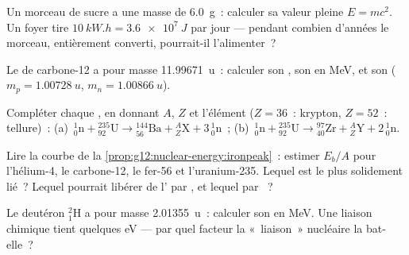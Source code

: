 \begin{exercise}[$\star$]\label{exo:g12:nuclear-energy:2}
Un morceau de sucre a une masse de \qty{6.0}{g}~: calculer sa valeur
pleine $E = mc^2$. Un foyer tire $\qty{10}{kW.h} = \qty{3.6e7}{J}$ par
jour --- pendant combien d'années le morceau, entièrement converti,
pourrait-il l'alimenter~?
\end{exercise}

\begin{exercise}[$\star$]\label{exo:g12:nuclear-energy:3}
Le  de carbone-12 a pour masse
\qty{11.99671}{u}~: calculer son , son
 en \unit{MeV}, et son
($m_p = \qty{1.00728}{u}$, $m_n = \qty{1.00866}{u}$).
\end{exercise}

\begin{exercise}[$\star$]\label{exo:g12:nuclear-energy:4}
Compléter chaque , en donnant $A$, $Z$ et
l'élément ($Z = 36$~: krypton, $Z = 52$~: tellure)~:
(a)~${}^{1}_{0}\mathrm{n} + {}^{235}_{92}\mathrm{U} \to
{}^{144}_{56}\mathrm{Ba} + {}^{A}_{Z}\mathrm{X} + 3\,{}^{1}_{0}\mathrm{n}$~;
(b)~${}^{1}_{0}\mathrm{n} + {}^{235}_{92}\mathrm{U} \to
{}^{97}_{40}\mathrm{Zr} + {}^{A}_{Z}\mathrm{Y} + 2\,{}^{1}_{0}\mathrm{n}$.
\end{exercise}

\begin{exercise}[$\star$]\label{exo:g12:nuclear-energy:5}
Lire la courbe de la \cref{prop:g12:nuclear-energy:ironpeak}~: estimer
$E_b/A$ pour l'hélium-4, le carbone-12, le fer-56 et l'uranium-235.
Lequel est le plus solidement lié~? Lequel pourrait libérer de
l' par , et
lequel par ~?
\end{exercise}

\begin{exercise}[$\star\star$]\label{exo:g12:nuclear-energy:6}
Le deutéron ${}^{2}_{1}\mathrm{H}$ a pour masse \qty{2.01355}{u}~:
calculer son  en \unit{MeV}. Une
liaison chimique tient quelques \unit{eV} --- par quel facteur la
«~liaison~» nucléaire la bat-elle~?
\end{exercise}

